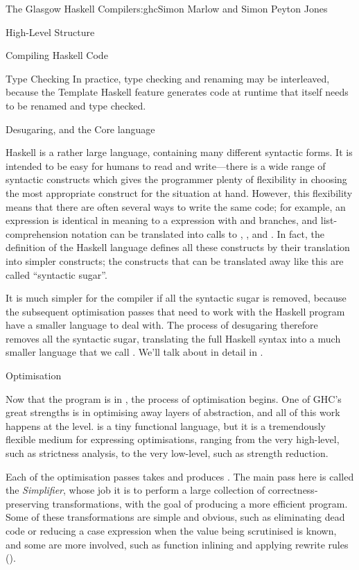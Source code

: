 \begin{aosachapter}{The Glasgow Haskell Compiler}{s:ghc}{Simon Marlow and Simon Peyton Jones}
\begin{aosasect1}{High-Level Structure}
\begin{aosasect2}{Compiling Haskell Code}
\begin{aosasect3}{Type Checking}
In practice, type checking and renaming may be interleaved, because
the Template Haskell feature generates code at runtime that itself
needs to be renamed and type checked.

\end{aosasect3}

\begin{aosasect3}{Desugaring, and the Core language}

Haskell is a rather large language, containing many different
syntactic forms.  It is intended to be easy for humans to read and
write---there is a wide range of syntactic constructs which gives the
programmer plenty of flexibility in choosing the most appropriate
construct for the situation at hand.  However, this flexibility means
that there are often several ways to write the same code; for example,
an  expression is identical in meaning to a 
expression with  and  branches, and
list-comprehension notation can be translated into calls to
, , and .  In fact, the definition
of the Haskell language defines all these constructs by their
translation into simpler constructs; the constructs that can be
translated away like this are called ``syntactic sugar''.

It is much simpler for the compiler if all the syntactic sugar is
removed, because the subsequent optimisation passes that need to work
with the Haskell program have a smaller language to deal with.  The
process of desugaring therefore removes all the syntactic sugar,
translating the full Haskell syntax into a much smaller language that
we call .  We'll talk about  in detail in .

\end{aosasect3}

\begin{aosasect3}{Optimisation}

Now that the program is in , the process of optimisation
begins.  One of GHC's great strengths is in optimising away layers of
abstraction, and all of this work happens at the  level.
 is a tiny functional language, but it is a tremendously
flexible medium for expressing optimisations, ranging from the very
high-level, such as strictness analysis, to the very low-level, such
as strength reduction.

Each of the optimisation passes takes  and produces
.  The main pass here is called the \emph{Simplifier}, whose job
it is to perform a large collection of correctness-preserving
transformations, with the goal of producing a more
efficient program.  Some of these transformations are simple and
obvious, such as eliminating dead code or reducing a case expression
when the value being scrutinised is known, and some are more involved,
such as function inlining and applying rewrite rules ().


\end{aosasect3}
\end{aosasect2}
\end{aosasect1}
\end{aosachapter}
